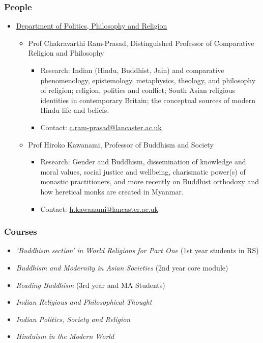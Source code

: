 \documentclass[11pt]{article}
\begin{document}
\subsubsection*{People}
\label{sec:orgfd96bcd}
\begin{itemize}
\item \href{https://www.lancaster.ac.uk/ppr/}{Department of Politics, Philosophy and Religion}
\label{sec:org2bde5d8}
\begin{itemize}
\item Prof Chakravarthi Ram-Prasad, Distinguished Professor of Comparative Religion and Philosophy
\label{sec:org2906c2f}
\begin{itemize}
\item Research: Indian (Hindu, Buddhist, Jain) and comparative phenomenology, epistemology, metaphysics, theology, and philosophy of religion; religion, politics and conflict; South Asian religious identities in contemporary Britain; the conceptual sources of modern Hindu life and beliefs.\\
\item Contact: \href{mailto:c.ram-prasad@lancaster.ac.uk}{c.ram-prasad@lancaster.ac.uk}\\
\end{itemize}
\item Prof Hiroko Kawanami, Professor of Buddhism and Society
\label{sec:org294c9bd}
\begin{itemize}
\item Research: Gender and Buddhism, dissemination of knowledge and moral values, social justice and wellbeing, charismatic power(s) of monastic practitioners, and more recently on Buddhist orthodoxy and how heretical monks are created in Myanmar.\\
\item Contact: \href{mailto:h.kawanami@lancaster.ac.uk}{h.kawanami@lancaster.ac.uk}\\
\end{itemize}
\end{itemize}
\end{itemize}
\subsubsection*{Courses}
\label{sec:org6f39234}
\begin{itemize}
\item \emph{‘Buddhism section’ in World Religions for Part One} (1st year students in RS)\\
\item \emph{Buddhism and Modernity in Asian Societies} (2nd year core module)\\
\item \emph{Reading Buddhism} (3rd year and MA Students)\\
\item \emph{Indian Religious and Philosophical Thought}\\
\item \emph{Indian Politics, Society and Religion}\\
\item \emph{Hinduism in the Modern World}\\
\end{itemize}
\end{document}
